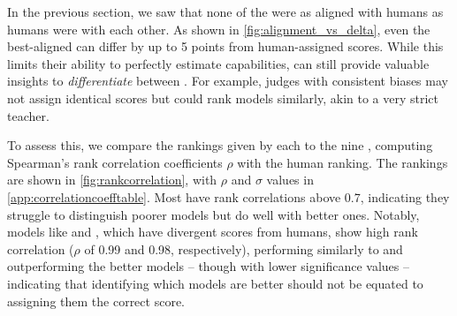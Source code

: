 

In the previous section, we saw that none of the \judgemodels were as aligned with humans as humans were with each other. As shown in \cref{fig:alignment_vs_delta}, even the best-aligned \judgemodels can differ by up to 5 points from human-assigned scores. While this limits their ability to perfectly estimate \evaluatormodel capabilities, \judgemodels can still provide valuable insights to \textit{differentiate} between \evaluatormodels. For example, judges with consistent biases may not assign identical scores but could rank models similarly, akin to a very strict teacher.

To assess this, we compare the rankings given by each \judgemodel to the nine \evaluatormodels, computing Spearman's rank correlation coefficients $\rho$ \citep{spearman1904spearman} with the human ranking. The rankings are shown in \cref{fig:rankcorrelation}, with $\rho$ and $\sigma$ values in \cref{app:correlationcoefftable}. Most \judgemodels have rank correlations above 0.7, indicating they struggle to distinguish poorer models but do well with better ones. Notably, models like  and , which have divergent scores from humans, show high rank correlation ($\rho$ of 0.99 and 0.98, respectively), performing similarly to \judge{\gpt} and outperforming the better  models -- though with lower significance values -- indicating that identifying which models are better should not be equated to assigning them the correct score.


